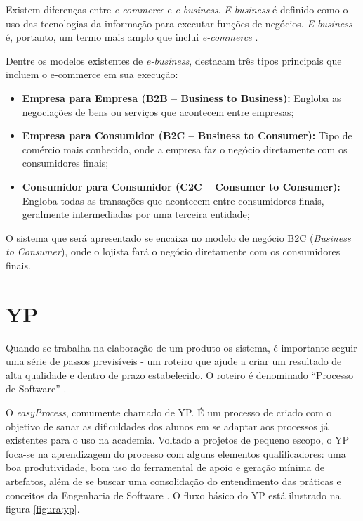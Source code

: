 \documentclass[a4paper,12pt]{monografia}
\begin{document}
Existem diferenças entre \textit{e-commerce} e \textit{e-business}. \textit{E-business} é definido como o uso das tecnologias da informação para executar funções de negócios. \textit{E-business} é, portanto, um termo mais amplo que inclui \textit{e-commerce} \cite{gordon}. 

Dentre os modelos existentes de \textit{e-business},  destacam três tipos principais que incluem o e-commerce em sua execução:

\begin{itemize}
\item \textbf{Empresa para Empresa (B2B – Business to Business):} Engloba as negociações de bens ou serviços que acontecem entre empresas;
\item \textbf{Empresa para Consumidor (B2C – Business to Consumer):} Tipo de comércio mais conhecido, onde a empresa faz o negócio diretamente com os consumidores finais;
\item \textbf{Consumidor para Consumidor (C2C – Consumer to Consumer):} Engloba todas as transações que acontecem entre consumidores finais, geralmente intermediadas por uma terceira entidade;
\end{itemize}

O sistema que será apresentado se encaixa no modelo de negócio B2C (\textit{Business to Consumer}), onde o lojista fará o negócio diretamente com os consumidores finais.

\section{YP} %
\label{sec:yp}

Quando se trabalha na elaboração de um produto os sistema, é importante seguir uma série de passos previsíveis - um roteiro que ajude a criar um resultado de alta qualidade e dentro de prazo estabelecido. O roteiro é denominado ``Processo de Software'' \cite{pressman}.

O \textit{easyProcess}, comumente chamado de YP. É um processo de  criado com o objetivo de sanar as dificuldades dos alunos em se adaptar aos processos já existentes para o uso na academia. Voltado a projetos de pequeno escopo, o YP foca-se na aprendizagem do processo com alguns elementos qualificadores: uma boa produtividade, bom uso do ferramental de apoio e geração mínima de artefatos, além de se buscar uma consolidação do entendimento das práticas e conceitos da Engenharia de Software \cite{easyprocess}. O fluxo básico do YP está ilustrado na figura \ref{figura:yp}.
\end{document}
